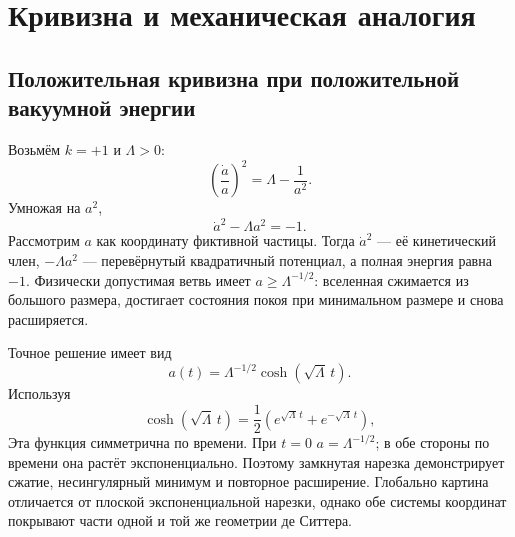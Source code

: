 \begin{classroomqa}
\end{classroomqa}

\section{Кривизна и механическая аналогия}

\subsection{Положительная кривизна при положительной вакуумной энергии}

Возьмём \(k=+1\) и \(\Lambda>0\):
\begin{equation}
\left(\frac{\dot a}{a}\right)^2=\Lambda-\frac{1}{a^2}.
\label{eq:c05-closed-vacuum}
\end{equation}
Умножая на \(a^2\),
\begin{equation}
\dot a^2-\Lambda a^2=-1.
\label{eq:c05-inverted-oscillator}
\end{equation}
Рассмотрим \(a\) как координату фиктивной частицы. Тогда \(\dot a^2\) — её кинетический член, \(-\Lambda a^2\) — перевёрнутый квадратичный потенциал, а полная энергия равна \(-1\). Физически допустимая ветвь имеет \(a\geq\Lambda^{-1/2}\): вселенная сжимается из большого размера, достигает состояния покоя при минимальном размере и снова расширяется.

Точное решение имеет вид
\begin{equation}
a(t)=\Lambda^{-1/2}\cosh(\sqrt{\Lambda}\,t).
\label{eq:c05-closed-desitter}
\end{equation}
Используя
\begin{equation}
\cosh(\sqrt{\Lambda}\,t)
=
\frac12\left(e^{\sqrt{\Lambda}\,t}+e^{-\sqrt{\Lambda}\,t}\right),
\end{equation}
Эта функция симметрична по времени. При \(t=0\) \(a=\Lambda^{-1/2}\); в обе стороны по времени она растёт экспоненциально. Поэтому замкнутая нарезка демонстрирует сжатие, несингулярный минимум и повторное расширение. Глобально картина отличается от плоской экспоненциальной нарезки, однако обе системы координат покрывают части одной и той же геометрии де Ситтера.

